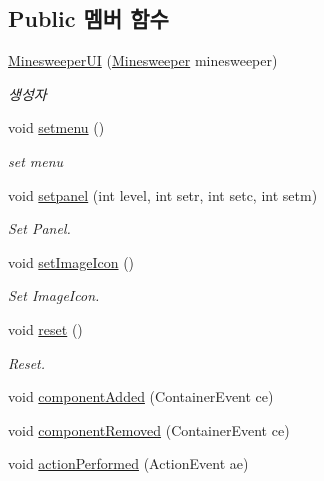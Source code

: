 \subsection*{Public 멤버 함수}
\begin{DoxyCompactItemize}
\item 
\hyperlink{classhufs_1_1cse_1_1khk_1_1_minesweeper_u_i_aac09dd5162a5dc77642c78c0cc5352f4}{Minesweeper\+UI} (\hyperlink{classhufs_1_1cse_1_1khk_1_1_minesweeper}{Minesweeper} minesweeper)
\begin{DoxyCompactList}\small\item\em 생성자 \end{DoxyCompactList}\item 
void \hyperlink{classhufs_1_1cse_1_1khk_1_1_minesweeper_u_i_a9d9ff2e282de36230ad02df0c9b53809}{setmenu} ()
\begin{DoxyCompactList}\small\item\em set menu \end{DoxyCompactList}\item 
void \hyperlink{classhufs_1_1cse_1_1khk_1_1_minesweeper_u_i_a9a871b3969d0f0c00cf420902d09cc18}{setpanel} (int level, int setr, int setc, int setm)
\begin{DoxyCompactList}\small\item\em Set Panel. \end{DoxyCompactList}\item 
void \hyperlink{classhufs_1_1cse_1_1khk_1_1_minesweeper_u_i_acf0fc1f12fcce4b62901961c425febb7}{set\+Image\+Icon} ()
\begin{DoxyCompactList}\small\item\em Set Image\+Icon. \end{DoxyCompactList}\item 
void \hyperlink{classhufs_1_1cse_1_1khk_1_1_minesweeper_u_i_a137388c25def2c90fe13e34d6234207d}{reset} ()
\begin{DoxyCompactList}\small\item\em Reset. \end{DoxyCompactList}\item 
void \hyperlink{classhufs_1_1cse_1_1khk_1_1_minesweeper_u_i_a1a12092d57cfb53d87a5c96672a984d9}{component\+Added} (Container\+Event ce)
\item 
void \hyperlink{classhufs_1_1cse_1_1khk_1_1_minesweeper_u_i_a1270d3daaaf848642adc88f5f735eb9f}{component\+Removed} (Container\+Event ce)
\item 
void \hyperlink{classhufs_1_1cse_1_1khk_1_1_minesweeper_u_i_a896a8e57a116a0b4b43fb88b575ab5b8}{action\+Performed} (Action\+Event ae)

\end{DoxyCompactItemize}
